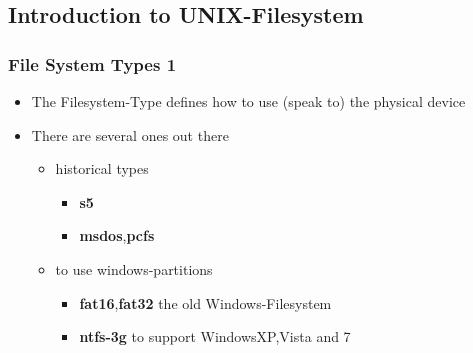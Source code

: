 \documentclass[hyperref={pdfpagelabels=false}]{beamer}
\begin{document}
	\subsection{Introduction to UNIX-Filesystem}
	    \begin{frame}
			\frametitle{File System Types 1}
			\begin{itemize}
                \item<1-> The Filesystem-Type defines how to use (speak to) the physical device
                \item<1-> There are several ones out there
                \begin{itemize}
                    \item<2-> historical types
                    \begin{itemize}
                        \item<2-> \textbf{s5}
                        \item<2-> \textbf{msdos},\textbf{pcfs}
                    \end{itemize}
                    \item<3-> to use windows-partitions
                    \begin{itemize}
                        \item<3-> \textbf{fat16},\textbf{fat32} the old Windows-Filesystem
                        \item<3-> \textbf{ntfs-3g} to support WindowsXP,Vista and 7
                    \end{itemize}
                \end{itemize}
            \end{itemize}
        \end{frame}
\end{document}
